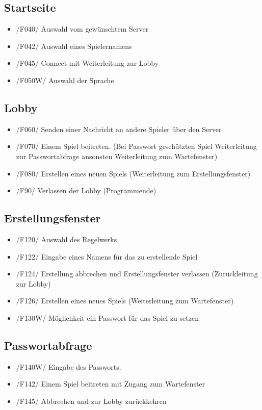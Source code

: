\documentclass{article}
\begin{document}
\subsection{Startseite}
\begin{itemize}
	\item /F040/ Auswahl vom gewünschtem \gls{Server} 
	\item /F042/ Auswahl eines Spielernamens
	\item /F045/ Connect mit Weiterleitung zur \gls{Lobby}
	\item /F050W/ Auswahl der Sprache
\end{itemize}

\subsection{\gls{Lobby}}
\begin{itemize}
	\item /F060/ Senden einer Nachricht an andere Spieler über den \gls{Server}
	\item /F070/ Einem Spiel beitreten. (Bei Passwort geschützten Spiel Weiterleitung zur Passwortabfrage ansonsten Weiterleitung zum \gls{Wartefenster})
	\item /F080/ Erstellen eines neuen Spiels (Weiterleitung zum \gls{Erstellungsfenster})
	\item /F90/ Verlassen der \gls{Lobby} (Programmende)
\end{itemize}

\subsection{Erstellungsfenster}
\begin{itemize}
	\item /F120/ Auswahl des \gls{Regelwerk}s
	\item /F122/ Eingabe eines Namens für das zu erstellende Spiel
	\item /F124/ Erstellung abbrechen und \gls{Erstellungsfenster} verlassen (Zurückleitung zur Lobby)
	\item /F126/ Erstellen eines neues Spiels (Weiterleitung zum Wartefenster)
	\item /F130W/ Möglichkeit ein Passwort für das Spiel zu setzen
\end{itemize}

\subsection{Passwortabfrage}
\begin{itemize}
	\item /F140W/ Eingabe des Passworts.
	\item /F142/ Einem Spiel beitreten mit Zugang zum \gls{Wartefenster}
	\item /F145/ Abbrechen und zur \gls{Lobby} zurückkehren
\end{itemize}
\end{document}
